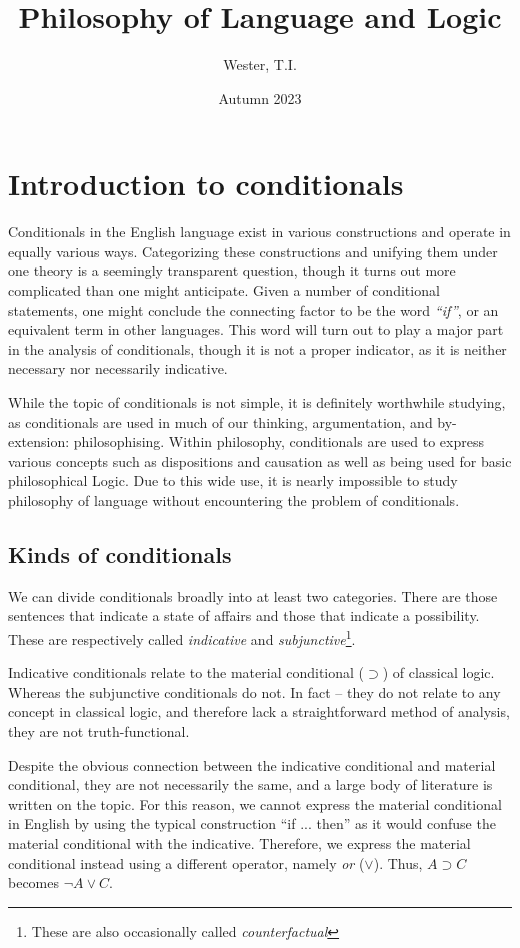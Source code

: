 \documentclass[12pt]{report}
\title{Philosophy of Language and Logic}
\date{Autumn 2023}
\author{Wester, T.I.}
\begin{document}
\maketitle
\tableofcontents

\chapter{Introduction to conditionals}

Conditionals in the English language exist in various constructions and operate
in equally various ways. Categorizing these constructions and unifying them
under one theory is a seemingly transparent question, though it turns out more
complicated than one might anticipate.  Given a number of conditional
statements, one might conclude the connecting factor to be the word \emph{``if''},
or an equivalent term in other languages. This word will turn out to play a
major part in the analysis of conditionals, though it is not a proper indicator,
as it is neither necessary nor necessarily indicative.

While the topic of conditionals is not simple, it is definitely worthwhile
studying, as conditionals are used in much of our thinking, argumentation, and
by-extension: philosophising. Within philosophy, conditionals are used to
express various concepts such as dispositions and causation as well as being
used for basic philosophical Logic. Due to this wide use, it is nearly
impossible to study philosophy of language without encountering the problem of
conditionals.

\section{Kinds of conditionals}

We can divide conditionals broadly into at least two categories. There are those
sentences that indicate a state of affairs and those that indicate a
possibility. These are respectively called \emph{indicative} and
\emph{subjunctive}\footnote{These are also occasionally called
\emph{counterfactual}}.

Indicative conditionals relate to the material conditional ($\supset$) of
classical logic. Whereas the subjunctive conditionals do not. In fact -- they do
not relate to any concept in classical logic, and therefore lack a
straightforward method of analysis, they are not truth-functional.

Despite the obvious connection between the indicative conditional and material
conditional, they are not necessarily the same, and a large body of literature
is written on the topic.  For this reason, we cannot express the material
conditional in English by using the typical construction ``if ... then'' as it
would confuse the material conditional with the indicative. Therefore, we
express the material conditional instead using a different operator, namely
\emph{or} ($\lor$). Thus, $A \supset C$ becomes $\lnot A \lor C$.
\end{document}

